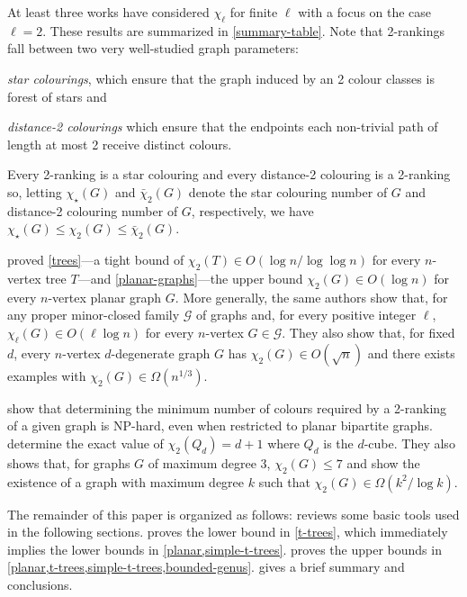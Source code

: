 \documentclass[kpfonts]{patmorin}
\newcommand{\trn}{\chi_2}
\newcommand{\dtcn}{\bar{\chi}_2}
\newcommand{\scn}{\chi_{\star}}
\theoremstyle{named}
\begin{document}
At least three works have considered $\chi_\ell$ for finite $\ell$ with a focus on the case $\ell=2$.  These results are summarized in \cref{summary-table}.  Note that 2-rankings fall between two very well-studied graph parameters:
\begin{compactitem}
    \item \emph{star colourings}, which ensure that the graph induced by an 2 colour classes is forest of stars and
    \item \emph{distance-2 colourings} which ensure that the endpoints each non-trivial path of length at most 2 receive distinct colours.
\end{compactitem}
Every 2-ranking is a star colouring and every distance-2 colouring is a 2-ranking so, letting $\scn(G)$ and $\dtcn(G)$ denote the star colouring number of $G$ and distance-2 colouring number of $G$, respectively, we have $\scn(G) \le \trn(G)\le \dtcn(G)$.

\citet{karpas.neiman.ea:on} proved \cref{trees}---a tight bound of $\trn(T)\in O(\log n/\log\log n)$ for every $n$-vertex tree $T$---and \cref{planar-graphs}---the upper bound $\trn(G)\in O(\log n)$ for every $n$-vertex planar graph $G$.  More generally, the same authors show that, for any proper minor-closed family $\mathcal{G}$ of graphs and, for every positive integer $\ell$, $\chi_\ell(G)\in O(\ell\log n)$ for every $n$-vertex $G\in\mathcal{G}$.  They also show that, for fixed $d$, every $n$-vertex $d$-degenerate graph $G$ has $\trn(G)\in O(\sqrt{n})$ and there exists examples with $\trn(G)\in\Omega(n^{1/3})$.

\citet{shalu.antony:complexity} show that determining the minimum number of colours required by a 2-ranking of a given graph is NP-hard, even when restricted to planar bipartite graphs.  \citet{almeter.demircan.ea:graph} determine the exact value of $\trn(Q_d)=d+1$ where $Q_d$ is the $d$-cube.  They also shows that, for graphs $G$ of maximum degree 3, $\trn(G)\le 7$ and show the existence of a graph with maximum degree $k$ such that $\trn(G)\in\Omega(k^2/\log k)$.

The remainder of this paper is organized as follows:  reviews some basic tools used in the following sections.    proves the lower bound in \cref{t-trees}, which immediately implies the lower bounds in \cref{planar,simple-t-trees}.  proves the upper bounds in \cref{planar,t-trees,simple-t-trees,bounded-genus}.   gives a brief summary and conclusions.
\end{document}
